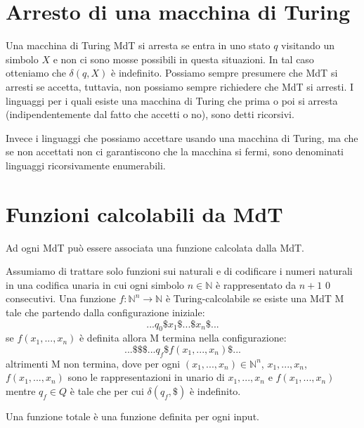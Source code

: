 \section{Arresto di una macchina di Turing}
Una macchina di Turing MdT si arresta se entra in uno stato $q$ visitando un simbolo $X$ e non ci sono mosse possibili in questa situazioni.
In tal caso otteniamo che $\delta(q,X)$ è indefinito.
Possiamo sempre presumere che MdT si arresti se accetta, tuttavia, non possiamo sempre richiedere che MdT si arresti. 
I linguaggi per i quali esiste una macchina di Turing che prima o poi si arresta (indipendentemente dal fatto che accetti o no), sono detti ricorsivi. 

Invece i linguaggi che possiamo accettare usando una macchina di Turing, ma che se non accettati non ci garantiscono che la macchina si fermi, sono denominati linguaggi ricorsivamente enumerabili. 

\section{Funzioni calcolabili da MdT}
Ad ogni MdT può essere associata una funzione calcolata dalla MdT.

\begin{definition}
Assumiamo di trattare solo funzioni sui naturali e di codificare i numeri naturali in una codifica unaria in cui ogni simbolo $n\in\mathbb{N}$ è rappresentato da $n+1$ $0$ consecutivi. 
Una funzione $f:\mathbb{N}^n\rightarrow \mathbb{N}$ è Turing-calcolabile se esiste una MdT M tale che partendo dalla configurazione iniziale: 
$$
...q_0\$x_1\$...\$x_n\$...
$$
se $f(x_1,...,x_n)$ è definita allora M termina nella configurazione:
$$
...\$\$\$...q_f\$f(x_1,...,x_n)\$...
$$
altrimenti M non termina, dove per ogni $(x_1,...,x_n)\in\mathbb{N}^n$, $x_1,...,x_n$, $f(x_1,...,x_n)$ sono le rappresentazioni in unario di $x_1,...,x_n$ e $f(x_1,...,x_n)$ mentre $q_f \in Q$ è tale che per cui $\delta(q_f, \$)$ è indefinito. 
\end{definition}

\begin{definition}
Una funzione totale è una funzione definita per ogni input.
\end{definition}

